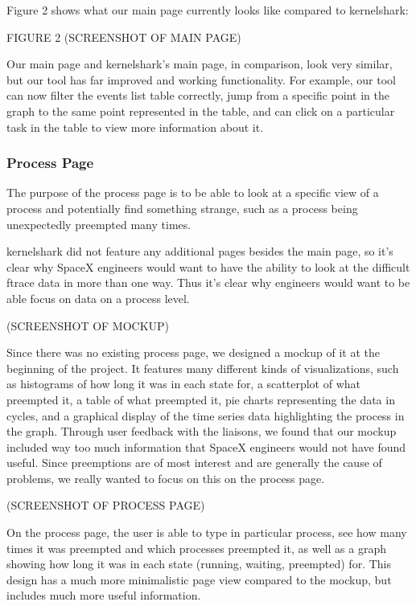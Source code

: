 \documentclass{hmcclinic}
\begin{document}
Figure 2 shows what our main page currently looks like compared to kernelshark:

FIGURE 2 (SCREENSHOT OF MAIN PAGE)

Our main page and kernelshark's main page, in comparison, look very similar, but our tool has far improved and working functionality. For example, our tool can now filter the events list table correctly, jump from a specific point in the graph to the same point represented in the table, and can click on a particular task in the table to view more information about it.

\subsubsection{Process Page}
The purpose of the process page is to be able to look at a specific view of a process and potentially find something strange, such as a process being unexpectedly preempted many times.

kernelshark did not feature any additional pages besides the main page, so it's clear why SpaceX engineers would want to have the ability to look at the difficult ftrace data in more than one way. Thus it's clear why engineers would want to be able focus on data on a process level.

(SCREENSHOT OF MOCKUP)

Since there was no existing process page, we designed a mockup of it at the beginning of the project. It features many different kinds of visualizations, such as histograms of how long it was in each state for, a scatterplot of what preempted it, a table of what preempted it, pie charts representing the data in cycles, and a graphical display of the time series data highlighting the process in the graph. Through user feedback with the liaisons, we found that our mockup included way too much information that SpaceX engineers would not have found useful. Since preemptions are of most interest and are generally the cause of problems, we really wanted to focus on this on the process page.

(SCREENSHOT OF PROCESS PAGE)

On the process page, the user is able to type in particular process, see how many times it was preempted and which processes preempted it, as well as a graph showing how long it was in each state (running, waiting, preempted) for. This design has a much more minimalistic page view compared to the mockup, but includes much more useful information.
\end{document}
